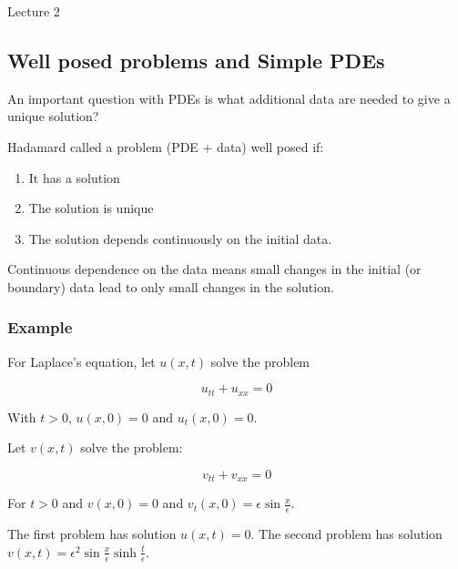 \begin{center}

Lecture 2

\end{center}

\subsection{Well posed problems and Simple PDEs}

An important question with PDEs is what additional data are needed to give a unique solution?

Hadamard called a problem (PDE + data) well posed if:

\begin{enumerate}

\item It has a solution
\item The solution is unique
\item The solution depends continuously on the initial data.

\end{enumerate}

Continuous dependence on the data means small changes in the initial (or boundary) data lead to only small changes in the solution.

\subsubsection*{Example}

For Laplace's equation, let $u(x,t)$ solve the problem

$$u_{tt} + u_{xx} = 0$$

With $t > 0$, $u(x, 0) = 0$ and $u_t (x, 0) = 0$.

Let $v(x, t)$ solve the problem:

$$v_{tt} + v_{xx} = 0$$

For $t > 0$ and $v(x, 0) = 0$ and $v_t (x, 0) = \epsilon \sin \frac{x}{\epsilon}$.

\vspace{\baselineskip}

The first problem has solution $u(x,t) = 0$. The second problem has solution $v(x,t) = \epsilon^2 \sin \frac{x}{\epsilon} \sinh \frac{t}{\epsilon}$.
 